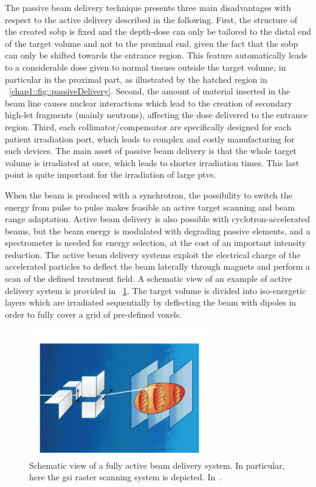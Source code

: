 The passive beam delivery technique presents three main disadvantages with respect to the active delivery described in the following. First, the structure of the created \gls{sobp} is fixed and the depth-dose can only be tailored to the distal end of the target volume and not to the proximal end, given the fact that the \gls{sobp} can only be shifted towards the entrance region. This feature automatically leads to a considerable dose given to normal tissues outside the target volume, in particular in the proximal part, as illustrated by the hatched region in \figurename~\ref{chap1::fig::passiveDelivery}. Second, the amount of material inserted in the beam line causes nuclear interactions which lead to the creation of secondary high-\gls{let} fragments (mainly neutrons), affecting the dose delivered to the entrance region. Third, each collimator/compensator are specifically designed for each patient irradiation port, which leads to complex and costly manufacturing for such devices.
The main asset of passive beam delivery is that the whole target volume is irradiated at once, which leads to shorter irradiation times. This last point is quite important for the irradiation of large \glspl{ptv}.

When the beam is produced with a synchrotron,  the possibility to switch the energy from pulse to pulse makes feasible an active target scanning and beam range adaptation. Active beam delivery is also possible with cyclotron-accelerated beams, but the beam energy is modulated with degrading passive elements, and a spectrometer is needed for energy selection, at the cost of an important intensity reduction. The active beam delivery systems exploit the electrical charge of the accelerated particles to deflect the beam laterally through magnets and perform a scan of the defined treatment field. A schematic view of an example of active delivery system is provided in \figurename~\ref{chap1::fig::activeDelivery}. The target volume is divided into iso-energetic layers which are irradiated sequentially by deflecting the beam with dipoles in order to fully cover a grid of pre-defined voxels.              

\begin{figure}[!htbp]
\centering
\includegraphics[width=0.7\textwidth]{03_GraphicFiles/chapter1_Introduction/activeDelivery.pdf}
\caption{Schematic view of a fully active beam delivery system. In particular, here the \gls{gsi} raster scanning system is depicted. In~\cite{Schulz-Ertner2006}.}
\label{chap1::fig::activeDelivery}
\end{figure} 

